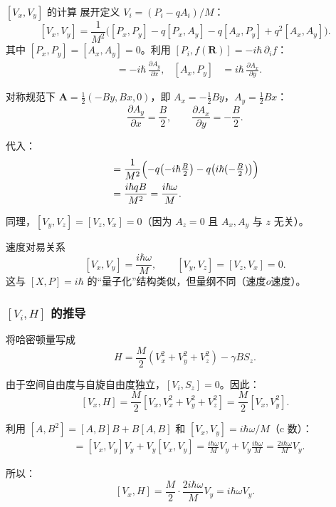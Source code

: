 \begin{derivationbox}{$[V_x, V_y]$ 的计算}
展开定义 $V_i=(P_i-qA_i)/M$：
\[
  [V_x,V_y] = \frac{1}{M^2}\bigl([P_x,P_y]-q[P_x,A_y]-q[A_x,P_y]+q^2[A_x,A_y]\bigr).
\]
其中 $[P_x,P_y]=[A_x,A_y]=0$。利用 $[P_i,f(\bm R)]=-i\hbar\,\partial_i f$：
\begin{align*}
  [P_x,A_y] &= -i\hbar\,\frac{\partial A_y}{\partial x},
  &[A_x,P_y] &= i\hbar\,\frac{\partial A_x}{\partial y}.
\end{align*}

对称规范下 $\bm A=\frac12(-By, Bx, 0)$，即 $A_x=-\frac12By$，$A_y=\frac12Bx$：
\[
  \frac{\partial A_y}{\partial x}=\frac{B}{2},\qquad
  \frac{\partial A_x}{\partial y}=-\frac{B}{2}.
\]

代入：
\begin{align*}
  [V_x,V_y]
  &= \frac{1}{M^2}\Bigl(-q\bigl(-i\hbar\tfrac{B}{2}\bigr)-q\bigl(i\hbar(-\tfrac{B}{2})\bigr)\Bigr) \\
  &= \frac{i\hbar qB}{M^2} = \frac{i\hbar\omega}{M}.
\end{align*}
\end{derivationbox}

同理，$[V_y,V_z]=[V_z,V_x]=0$（因为 $A_z=0$ 且 $A_x,A_y$ 与 $z$ 无关）。

\begin{formulabox}{速度对易关系}
\[
  \boxed{[V_x,V_y]=\frac{i\hbar\omega}{M}}, \qquad [V_y,V_z]=[V_z,V_x]=0.
\]
这与 $[X,P]=i\hbar$ 的``量子化''结构类似，但量纲不同（速度$	o$速度）。
\end{formulabox}

\subsubsection{$[V_i, H]$ 的推导}

将哈密顿量写成
\[
  H = \frac{M}{2}(V_x^2+V_y^2+V_z^2) - \gamma B S_z.
\]

由于空间自由度与自旋自由度独立，$[V_i, S_z]=0$。因此：
\[
  [V_x, H] = \frac{M}{2}[V_x, V_x^2+V_y^2+V_z^2] = \frac{M}{2}[V_x, V_y^2].
\]

利用 $[A,B^2]=[A,B]B+B[A,B]$ 和 $[V_x,V_y]=i\hbar\omega/M$（c 数）：
\begin{align*}
  [V_x, V_y^2]
  &= [V_x,V_y]V_y + V_y[V_x,V_y]
   = \frac{i\hbar\omega}{M}V_y + V_y\frac{i\hbar\omega}{M}
   = \frac{2i\hbar\omega}{M}V_y.
\end{align*}

所以：
\[
  [V_x, H] = \frac{M}{2}\cdot\frac{2i\hbar\omega}{M}V_y = i\hbar\omega V_y.
\]

